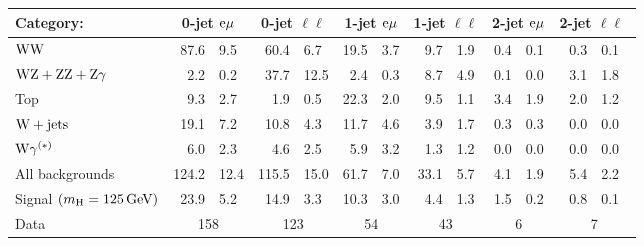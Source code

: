 \documentclass[11pt,twoside,a4paper,cmspaper,final]{cms-tdr}
\begin{document}
\begin{table}[htbp]
  \begin{center}
   \label{tab:hwwselection}
 {
\begin{tabular} {l|r@{$\,\pm\,$}l|r@{$\,\pm\,$ }l|r@{$\,\pm\,$}l|r@{$\,\pm\,$}l|r@{$\,\pm\,$}l|r@{$\,\pm\,$}l}
\hline
Category: & \multicolumn{2}{c|}{0-jet $\mathrm{e}\mu$} & \multicolumn{2}{c|}{0-jet $\ell\ell$} & \multicolumn{2}{c|}{1-jet $\mathrm{e}\mu$} & \multicolumn{2}{c|}{1-jet $\ell\ell$} & \multicolumn{2}{c|}{2-jet $\mathrm{e}\mu$} & \multicolumn{2}{c}{2-jet $\ell\ell ^{\phantom{^0} }_{ \phantom{_0} }$ }\\
\hline \hline
$\mathrm{W}\mathrm{W}$ & 87.6&9.5 & 60.4&6.7 & 19.5&3.7 & 9.7&1.9 & 0.4&0.1 & 0.3&0.1 \\
$\mathrm{W}\mathrm{Z} +\mathrm{Z}\mathrm{Z} +\mathrm{Z}\gamma$ & 2.2&0.2 & 37.7&12.5 & 2.4&0.3 & 8.7&4.9 & 0.1&0.0 & 3.1&1.8 \\
Top  & 9.3&2.7 & 1.9&0.5 & 22.3&2.0 & 9.5&1.1 & 3.4&1.9 & 2.0&1.2 \\
$\mathrm{W}+\text{jets}$ & 19.1&7.2 & 10.8&4.3 & 11.7&4.6 & 3.9&1.7 & 0.3&0.3 & 0.0&0.0 \\
$\mathrm{W}\gamma^{(*)}$ & 6.0&2.3 & 4.6&2.5 & 5.9&3.2 & 1.3&1.2 & 0.0&0.0 & 0.0&0.0 \\
\hline
All backgrounds & 124.2&12.4 & 115.5&15.0 & 61.7&7.0 & 33.1&5.7 & 4.1&1.9 & 5.4&2.2\\
\hline
Signal \small{$(m_{\mathrm{H}} = 125\,\text{Ge\hspace{-.08em}V})$} & 23.9&5.2 & 14.9&3.3 & 10.3&3.0 & 4.4&1.3 & 1.5&0.2 & 0.8&0.1 \\
\hline
Data & \multicolumn{2}{c|}{158} & \multicolumn{2}{c|}{123} & \multicolumn{2}{c|}{54} & \multicolumn{2}{c|}{43} & \multicolumn{2}{c|}{6} & \multicolumn{2}{c}{7}\\
\hline
\end{tabular}
  }
  \end{center}
\end{table}
\end{document}
